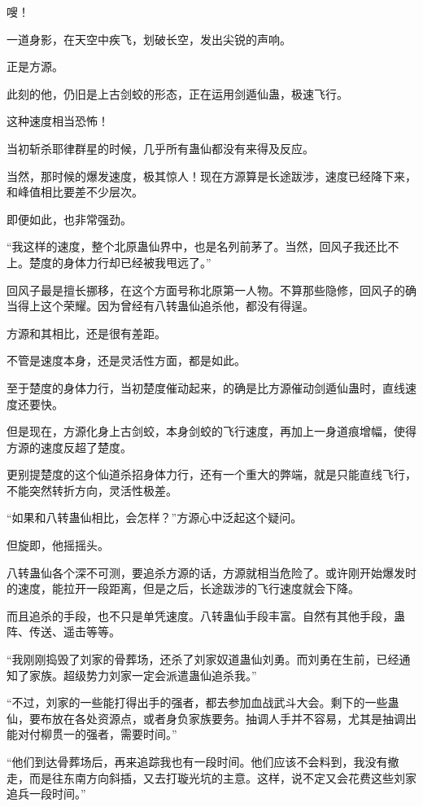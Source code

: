
\begin{this_body}

嗖！

一道身影，在天空中疾飞，划破长空，发出尖锐的声响。

正是方源。

此刻的他，仍旧是上古剑蛟的形态，正在运用剑遁仙蛊，极速飞行。

这种速度相当恐怖！

当初斩杀耶律群星的时候，几乎所有蛊仙都没有来得及反应。

当然，那时候的爆发速度，极其惊人！现在方源算是长途跋涉，速度已经降下来，和峰值相比要差不少层次。

即便如此，也非常强劲。

“我这样的速度，整个北原蛊仙界中，也是名列前茅了。当然，回风子我还比不上。楚度的身体力行却已经被我甩远了。”

回风子最是擅长挪移，在这个方面号称北原第一人物。不算那些隐修，回风子的确当得上这个荣耀。因为曾经有八转蛊仙追杀他，都没有得逞。

方源和其相比，还是很有差距。

不管是速度本身，还是灵活性方面，都是如此。

至于楚度的身体力行，当初楚度催动起来，的确是比方源催动剑遁仙蛊时，直线速度还要快。

但是现在，方源化身上古剑蛟，本身剑蛟的飞行速度，再加上一身道痕增幅，使得方源的速度反超了楚度。

更别提楚度的这个仙道杀招身体力行，还有一个重大的弊端，就是只能直线飞行，不能突然转折方向，灵活性极差。

“如果和八转蛊仙相比，会怎样？”方源心中泛起这个疑问。

但旋即，他摇摇头。

八转蛊仙各个深不可测，要追杀方源的话，方源就相当危险了。或许刚开始爆发时的速度，能拉开一段距离，但是之后，长途跋涉的飞行速度就会下降。

而且追杀的手段，也不只是单凭速度。八转蛊仙手段丰富。自然有其他手段，蛊阵、传送、遥击等等。

“我刚刚捣毁了刘家的骨葬场，还杀了刘家奴道蛊仙刘勇。而刘勇在生前，已经通知了家族。超级势力刘家一定会派遣蛊仙追杀我。”

“不过，刘家的一些能打得出手的强者，都去参加血战武斗大会。剩下的一些蛊仙，要布放在各处资源点，或者身负家族要务。抽调人手并不容易，尤其是抽调出能对付柳贯一的强者，需要时间。”

“他们到达骨葬场后，再来追踪我也有一段时间。他们应该不会料到，我没有撤走，而是往东南方向斜插，又去打璇光坑的主意。这样，说不定又会花费这些刘家追兵一段时间。”


\end{this_body}
